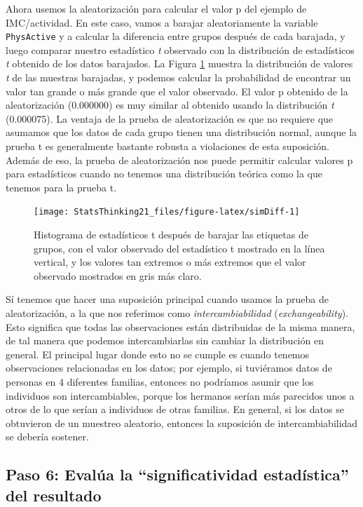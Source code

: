 \documentclass[
  12pt,
]{book}
\begin{document}
Ahora usemos la aleatorización para calcular el valor p del ejemplo de IMC/actividad. En este caso, vamos a barajar aleatoriamente la variable \texttt{PhysActive} y a calcular la diferencia entre grupos después de cada barajada, y luego comparar nuestro estadístico \emph{t} observado con la distribución de estadísticos \emph{t} obtenido de los datos barajados. La Figura \ref{fig:simDiff} muestra la distribución de valores \emph{t} de las muestras barajadas, y podemos calcular la probabilidad de encontrar un valor tan grande o más grande que el valor observado. El valor p obtenido de la aleatorización (0.000000) es muy similar al obtenido usando la distribución \emph{t} (0.000075). La ventaja de la prueba de aleatorización es que no requiere que asumamos que los datos de cada grupo tienen una distribución normal, aunque la prueba t es generalmente bastante robusta a violaciones de esta suposición. Además de eso, la prueba de aleatorización nos puede permitir calcular valores p para estadísticos cuando no tenemos una distribución teórica como la que tenemos para la prueba t.

\begin{figure}
\texttt{[image: StatsThinking21\_files/figure-latex/simDiff-1]} \caption{Histograma de estadísticos t después de barajar las etiquetas de grupos, con el valor observado del estadístico t mostrado en la línea vertical, y los valores tan extremos o más extremos que el valor observado mostrados en gris más claro.}\label{fig:simDiff}
\end{figure}

Sí tenemos que hacer una suposición principal cuando usamos la prueba de aleatorización, a la que nos referimos como \emph{intercambiabilidad} (\emph{exchangeability}). Esto significa que todas las observaciones están distribuidas de la misma manera, de tal manera que podemos intercambiarlas sin cambiar la distribución en general. El principal lugar donde esto no se cumple es cuando tenemos observaciones relacionadas en los datos; por ejemplo, si tuviéramos datos de personas en 4 diferentes familias, entonces no podríamos asumir que los individuos son intercambiables, porque los hermanos serían más parecidos unos a otros de lo que serían a individuos de otras familias. En general, si los datos se obtuvieron de un muestreo aleatorio, entonces la suposición de intercambiabilidad se debería sostener.

\hypertarget{paso-6-evaluxfaa-la-significatividad-estaduxedstica-del-resultado}{%
\subsection{Paso 6: Evalúa la ``significatividad estadística'' del resultado}\label{paso-6-evaluxfaa-la-significatividad-estaduxedstica-del-resultado}}
\end{document}
